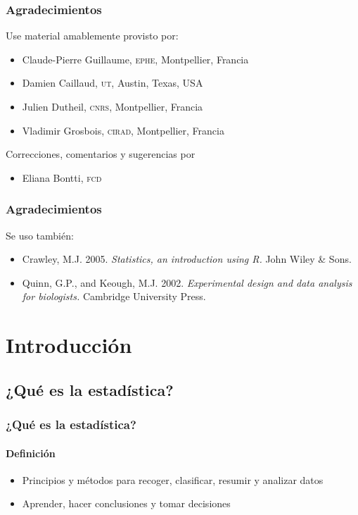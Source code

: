 \documentclass[mathserif]{beamer}
\begin{document}
\begin{frame}[label=tnx1]
\frametitle{Agradecimientos}
Use material amablemente provisto por:
  \begin{itemize}
    \item Claude-Pierre Guillaume, \textsc{ephe}, Montpellier, Francia
    \item Damien Caillaud, \textsc{ut}, Austin, Texas, USA
    \item Julien Dutheil, \textsc{cnrs}, Montpellier, Francia
    \item Vladimir Grosbois, \textsc{cirad}, Montpellier, Francia
  \end{itemize}
  \medskip
Correcciones, comentarios y sugerencias por
  \begin{itemize}
     \item Eliana Bontti, \textsc{fcd}
  \end{itemize}
\end{frame}%

 
\begin{frame}[label=tnx2]
   \frametitle{Agradecimientos}
   Se uso tambi\'en:
    \begin{itemize}
      \item Crawley, M.J. 2005. \emph{Statistics, an introduction using R.} John Wiley \& Sons.
      \item Quinn, G.P., and Keough, M.J. 2002. \emph{Experimental design and data analysis for biologists.} Cambridge University Press. 
   \end{itemize}
\end{frame}%








\section{Introducci\'on}

\subsection[¿Qu\'e es?]{¿Qu\'e es la estad\'istica?}

\begin{frame}[label=def]
  \frametitle{¿Qu\'e es la estad\'istica?}
  \framesubtitle{Definici\'on}
  \begin{itemize}[<+-| handout:1>]
    \item Principios y m\'etodos para recoger, clasificar, resumir y analizar datos 
    \item Aprender, hacer conclusiones y tomar decisiones
  \end{itemize}
\end{frame}%
\end{document}
